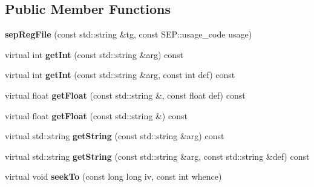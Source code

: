\subsection*{Public Member Functions}
\begin{DoxyCompactItemize}
\item 
\mbox{\label{class_s_e_p_1_1sep_reg_file_a6cd871400ef12a07123e51994334ed5f}} 
{\bfseries sep\+Reg\+File} (const std\+::string \&tg, const S\+E\+P\+::usage\+\_\+code usage)
\item 
\mbox{\label{class_s_e_p_1_1sep_reg_file_a9f73337a5450296c930d81f8d5befda8}} 
virtual int {\bfseries get\+Int} (const std\+::string \&arg) const
\item 
\mbox{\label{class_s_e_p_1_1sep_reg_file_a1ec5e0b937f5ef03d2b327d6b7768130}} 
virtual int {\bfseries get\+Int} (const std\+::string \&arg, const int def) const
\item 
\mbox{\label{class_s_e_p_1_1sep_reg_file_a6ef5e94606e1a0a2852d3bc0df824f49}} 
virtual float {\bfseries get\+Float} (const std\+::string \&, const float def) const
\item 
\mbox{\label{class_s_e_p_1_1sep_reg_file_a8fcd76dd4b34bdd1510b5b5654dec42f}} 
virtual float {\bfseries get\+Float} (const std\+::string \&) const
\item 
\mbox{\label{class_s_e_p_1_1sep_reg_file_abfdf8a85d629ecd75d64b15923918aba}} 
virtual std\+::string {\bfseries get\+String} (const std\+::string \&arg) const
\item 
\mbox{\label{class_s_e_p_1_1sep_reg_file_a44b98ba8c1bba611ea266f536faf602a}} 
virtual std\+::string {\bfseries get\+String} (const std\+::string \&arg, const std\+::string \&def) const
\item 
\mbox{\label{class_s_e_p_1_1sep_reg_file_a9404ab7c4a22ed1c4f95b2b3b0e03a82}} 
virtual void {\bfseries seek\+To} (const long long iv, const int whence)
\item 
\mbox{\label{class_s_e_p_1_1sep_reg_file_a160c2615661d1c35e56613635eabd10c}} 

\end{DoxyCompactItemize}
